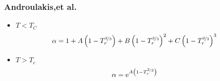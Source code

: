 \subsubsection{Androulakis,et al.\cite{androulakis}}

\begin{itemize}
\item{$T < T_C$}
\begin{equation}
 \alpha = 1 + A \left(1-T_r^{\nicefrac{2}{3}}\right) + B\left(1-T_r^{\nicefrac{2}{3}}\right)^2+ C\left(1-T_r^{\nicefrac{2}{3}}\right)^3
\end{equation}
\item{$T > T_c$}
\begin{equation}
\alpha = \mathrm{e}^{A\left(1-T_r^{\nicefrac{2}{3}}\right)}
\end{equation}
\end{itemize}
